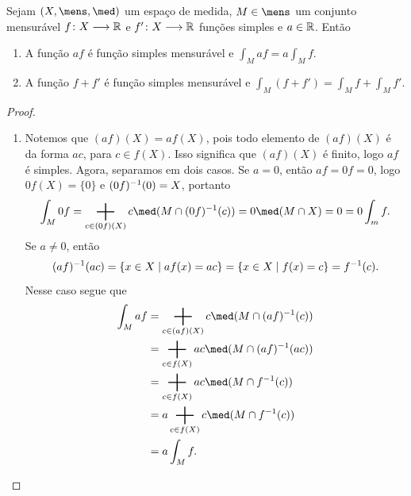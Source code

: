 \begin{prop}
Sejam $(X,\mens,\med)$ um espaço de medida, $M \in \mens$ um conjunto mensurável $f\colon X \longrightarrow \mathbb{R}$ e $f'\colon X \longrightarrow \mathbb{R}$ funções simples e $a \in \mathbb{R}$. Então
	\begin{enumerate}
	\item A função $af$ é função simples mensurável e $\displaystyle\int_M af = a\int_M f$.
	\item A função $f+f'$ é função simples mensurável e $\displaystyle\int_M (f+f') = \int_M f + \int_M f'$.
	\end{enumerate}
\end{prop}
\begin{proof}
\begin{enumerate}
	\item Notemos que $(af)(X) = af(X)$, pois todo elemento de $(af)(X)$ é da forma $ac$, para $c \in f(X)$. Isso significa que $(af)(X)$ é finito, logo $af$ é simples. Agora, separamos em dois casos. Se $a=0$, então $af=0f=0$, logo $0f(X)=\{0\}$ e $(0f)^{-1}(0)=X$, portanto
	\begin{equation*}
	\int_M 0f = \sum_{c \in (0f)(X)} c \med(M \cap (0f)\inv(c)) = 0 \med(M \cap X) = 0 = 0\int_m f.
	\end{equation*}
Se $a \neq 0$, então
	\begin{equation*}
	(af)^{-1}(ac) = \left\{x \in X \;\middle\vert\; af(x)=ac \right\} = \left\{x \in X \;\middle\vert\; f(x)=c \right\} = f^{-1}(c).
	\end{equation*}
	Nesse caso segue que
	\begin{align*}
	\int_M af &= \sum_{c \in (af)(X)} c \med(M \cap (af)\inv(c)) \\
		&= \sum_{c \in f(X)} ac \med(M \cap (af)\inv(ac)) \\
		&= \sum_{c \in f(X)} ac \med(M \cap f\inv(c)) \\
		&= a\sum_{c \in f(X)} c \med(M \cap f\inv(c)) \\
		&= a\int_M f.
	\end{align*}


\end{enumerate}
\end{proof}
